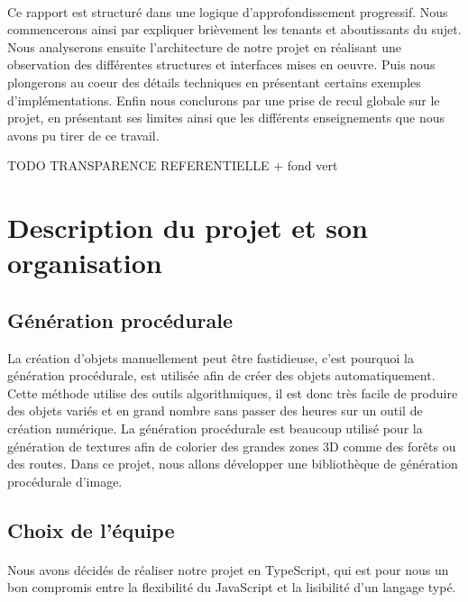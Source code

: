 \documentclass{article}
\begin{document}
\paragraph{}
Ce rapport est structuré dans une logique d'approfondissement progressif. Nous commencerons ainsi par expliquer brièvement les tenants et aboutissants du sujet.
Nous analyserons ensuite l'architecture de notre projet en réalisant une observation des différentes structures et interfaces mises en oeuvre.
Puis nous plongerons au coeur des détails techniques en présentant certains exemples d'implémentations.
Enfin nous conclurons par une prise de recul globale sur le projet, en présentant ses limites ainsi que les différents enseignements que nous avons pu tirer de ce travail. 

\newpage
\tableofcontents
\fancyhead[L]{\slshape \leftmark}
\newpage
TODO TRANSPARENCE REFERENTIELLE + fond vert

\section{Description du projet et son organisation}
\subsection{Génération procédurale}

La création d'objets manuellement peut être fastidieuse, c'est pourquoi la génération procédurale, est utilisée afin de créer des objets automatiquement. Cette méthode utilise des outils algorithmiques, il est donc très facile de produire des objets variés  et en grand nombre sans passer des heures sur un outil de création numérique. La génération procédurale est beaucoup utilisé pour la génération de textures afin de colorier des grandes zones 3D comme des forêts ou des routes.
Dans ce projet, nous allons développer une bibliothèque de génération procédurale d'image.

\subsection{Choix de l'équipe}

\paragraph{}
Nous avons décidés de réaliser notre projet en TypeScript, qui est pour nous un bon compromis entre la flexibilité du JavaScript et la lisibilité d'un langage typé.
\end{document}

